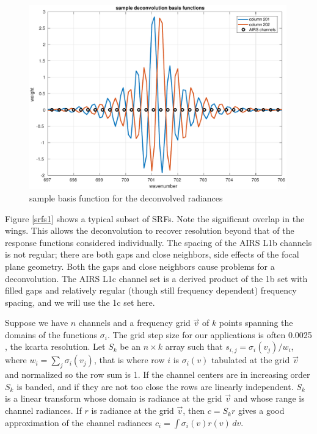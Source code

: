 \documentclass[12pt]{article}
\begin{document}
\begin{figure} %
  \centering
  \includegraphics[height=8cm]{figures/airs_decon_basis.pdf}
  \caption{sample basis function for the deconvolved {\airs}
    radiances}
  \label{dbasis}
\end{figure}

Figure \ref{srfs1} shows a typical subset of {\airs} SRFs.  Note the
significant overlap in the wings.  This allows the deconvolution to
recover resolution beyond that of the response functions considered
individually.  The spacing of the AIRS L1b channels is not regular;
there are both gaps and close neighbors, side effects of the focal
plane geometry.  Both the gaps and close neighbors cause problems for
a deconvolution.  The AIRS L1c channel set \cite{airs1c} is a derived
product of the 1b set with filled gaps and relatively regular (though
still frequency dependent) frequency spacing, and we will use the 1c
set here.

Suppose we have $n$ channels and a frequency grid $\vec v$ of $k$
points spanning the domains of the functions $\sigma_i$.  The grid
step size for our applications is often 0.0025 {\wn}, the kcarta
resolution.  Let $S_k$ be an $n\times k$ array such that $s_{i,j} =
\sigma_i(v_j)/w_i$, where $w_i = \sum_j \sigma_i(v_j)$, that is
where row $i$ is $\sigma_i(v)$ tabulated at the grid $\vec v$ and
normalized so the row sum is 1.  If the channel centers are in
increasing order $S_k$ is banded, and if they are not too close the
rows are linearly independent.  $S_k$ is a linear transform whose
domain is radiance at the grid $\vec v$ and whose range is channel
radiances.  If $r$ is radiance at the grid $\vec v$, then $c = S_k r$
gives a good approximation of the channel radiances $c_i = 
\int\sigma_i(v)r(v)\,dv$.
\end{document}
